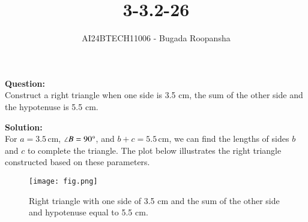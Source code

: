 \documentclass[journal]{IEEEtran}
\begin{document}

\vspace{3cm}

\title{3-3.2-26}
\author{AI24BTECH11006 - Bugada Roopansha}

{\let\newpage\relax\maketitle}  %

\renewcommand{\thefigure}{\theenumi}
\renewcommand{\thetable}{\theenumi}
\setlength{\intextsep}{10pt} %

\textbf{Question:}\\
Construct a right triangle when one side is 3.5 cm, the sum of the other side and the hypotenuse is 5.5 cm.

\textbf{Solution:}\\
For \( a = 3.5 \, \text{cm} \), \( \angle B = 90\degree \), and \( b + c = 5.5 \, \text{cm} \), we can find the lengths of sides \( b \) and \( c \) to complete the triangle. The plot below illustrates the right triangle constructed based on these parameters.

\begin{figure}[h!]
\centering
\texttt{[image: fig.png]} %
\caption{Right triangle with one side of 3.5 cm and the sum of the other side and hypotenuse equal to 5.5 cm.}

\end{figure}
\end{document}

